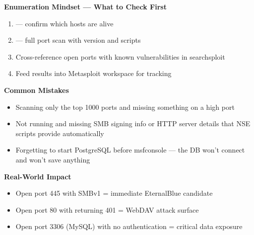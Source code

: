 \begin{notebox}
\begin{takebox}
\textbf{Enumeration Mindset --- What to Check First}
\begin{enumerate}
  \item {} --- confirm which hosts are alive
  \item {} --- full port scan with version and scripts
  \item Cross-reference open ports with known vulnerabilities in searchsploit
  \item Feed results into Metasploit workspace for tracking
\end{enumerate}

\textbf{Common Mistakes}
\begin{itemize}
  \item Scanning only the top 1000 ports and missing something on a high port
  \item Not running  and missing SMB signing info or HTTP server details
        that NSE scripts provide automatically
  \item Forgetting to start PostgreSQL before msfconsole --- the DB won't connect
        and  won't save anything
\end{itemize}

\textbf{Real-World Impact}
\begin{itemize}
  \item Open port 445 with SMBv1 = immediate EternalBlue candidate
  \item Open port 80 with  returning 401 = WebDAV attack surface
  \item Open port 3306 (MySQL) with no authentication = critical data exposure
\end{itemize}
\end{takebox}

\end{notebox}